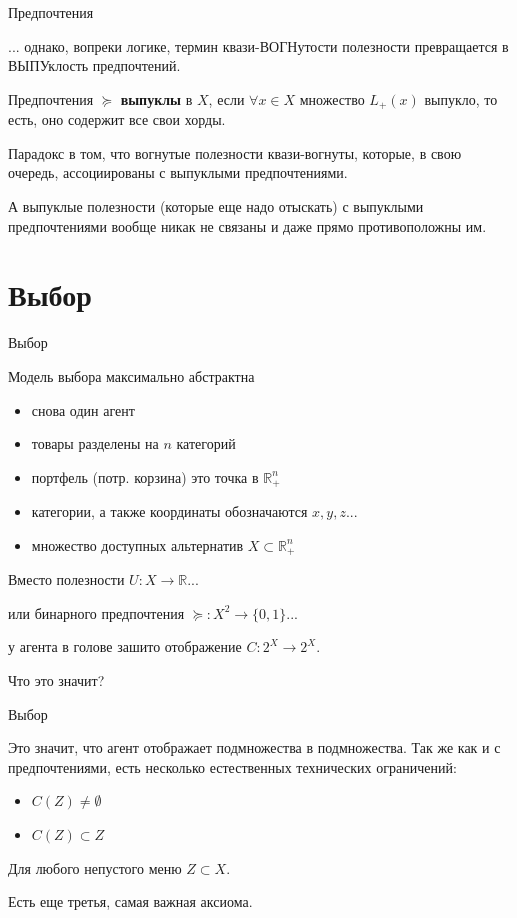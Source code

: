 \documentclass{beamer}
\begin{document}
\begin{frame}{Предпочтения}

... однако, вопреки логике, термин квази-ВОГНутости полезности превращается в ВЫПУклость предпочтений.

\begin{definition}
Предпочтения $\succcurlyeq$ \textbf{выпуклы} в $X$, если $\forall x \in X$ множество $L_{+}(x)$ выпукло, то есть, оно содержит все свои хорды. 
\end{definition}

Парадокс в том, что вогнутые полезности квази-вогнуты, которые, в свою очередь, ассоциированы с выпуклыми предпочтениями. 

А выпуклые полезности (которые еще надо отыскать) с выпуклыми предпочтениями вообще никак не связаны и даже прямо противоположны им. 

\end{frame}

\section{Выбор}

\begin{frame}{Выбор}

Модель выбора максимально абстрактна

\begin{itemize}
\item снова один агент
\item товары разделены на $n$ категорий
\item портфель (потр. корзина) это точка в $\mathbb{R}_{+}^{n}$	
\item категории, а также координаты обозначаются $x, y, z...$
\item множество доступных альтернатив $X \subset \mathbb{R}_{+}^{n}$
\end{itemize}

Вместо полезности $U: X \to \mathbb{R}$...

или бинарного предпочтения $\succcurlyeq: X^2 \to \{0,1\}$...

у агента в голове зашито отображение $C: 2^X \to 2^X$. 

Что это значит?

\end{frame}

\begin{frame}{Выбор}

Это значит, что агент отображает подмножества в подмножества. Так же как и с предпочтениями, есть несколько естественных технических ограничений:

\begin{itemize}
  \item $C(Z) \neq \emptyset$
  \item $C(Z) \subset Z$
\end{itemize}

Для любого непустого меню $Z \subset X$. 

Есть еще третья, самая важная аксиома.

\end{frame}
\end{document}
